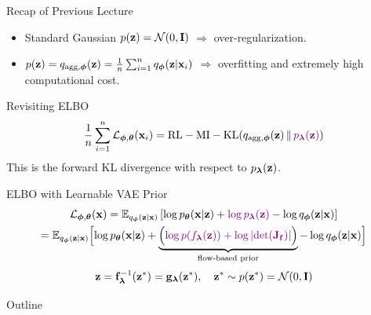 \documentclass{beamer}
\begin{document}
\begin{frame}{Recap of Previous Lecture}
	\begin{itemize}
		\item Standard Gaussian $p(\mathbf{z}) = \mathcal{N}(0, \mathbf{I})$ $\Rightarrow$ over-regularization.
		\item $p(\mathbf{z}) = q_{\text{agg}, \boldsymbol{\phi}}(\mathbf{z}) = \frac{1}{n}\sum_{i=1}^n q_{\boldsymbol{\phi}}(\mathbf{z}| \mathbf{x}_i)$ $\Rightarrow$ overfitting and extremely high computational cost.
	\end{itemize}
	\begin{block}{Revisiting ELBO}
		\vspace{-0.4cm}
		\[
		\frac{1}{n}\sum_{i=1}^n \mathcal{L}_{\boldsymbol{\phi}, \boldsymbol{\theta}}(\mathbf{x}_i) = \text{RL} - \text{MI} -  \mathrm{KL}(q_{\text{agg}, \boldsymbol{\phi}}(\mathbf{z}) \,\|\, {\color{violet}p_{\boldsymbol{\lambda}}(\mathbf{z})})
		\]
		This is the forward KL divergence with respect to $p_{\boldsymbol{\lambda}}(\mathbf{z})$.
	\end{block}
	\begin{block}{ELBO with Learnable VAE Prior}
		\vspace{-0.6cm}
		{\small
			\begin{multline*}
				\mathcal{L}_{\boldsymbol{\phi}, \boldsymbol{\theta}}(\mathbf{x}) = \mathbb{E}_{q_{\boldsymbol{\phi}}(\mathbf{z}| \mathbf{x})} \left[ \log p_{\boldsymbol{\theta}}(\mathbf{x} | \mathbf{z}) + {\color{violet}\log p_{\boldsymbol{\lambda}}(\mathbf{z})} - \log q_{\boldsymbol{\phi}}(\mathbf{z}| \mathbf{x}) \right] \\
				= \mathbb{E}_{q_{\boldsymbol{\phi}}(\mathbf{z}| \mathbf{x})} \Bigl[ \log p_{\boldsymbol{\theta}}(\mathbf{x} | \mathbf{z}) + \underbrace{ \Bigl({\color{violet} \log p(f_{\boldsymbol{\lambda}}(\mathbf{z})) + \log \left| \det (\mathbf{J}_{\mathbf{f}}) \right|} \Bigr) }_{\text{flow-based prior}} - \log q_{\boldsymbol{\phi}}(\mathbf{z}| \mathbf{x}) \Bigr] 
			\end{multline*}
		}
		\vspace{-0.5cm}
		\[
			\mathbf{z} = \mathbf{f}^{-1}_{\boldsymbol{\lambda}}(\mathbf{z}^*) = \mathbf{g}_{\boldsymbol{\lambda}}(\mathbf{z}^*), \quad \mathbf{z}^* \sim p(\mathbf{z}^*) = \mathcal{N}(0, \mathbf{I})
		\]
	\end{block}
	\vspace{-0.5cm}
\end{frame}
\begin{frame}{Outline}
	\tableofcontents
\end{frame}
\end{document}
